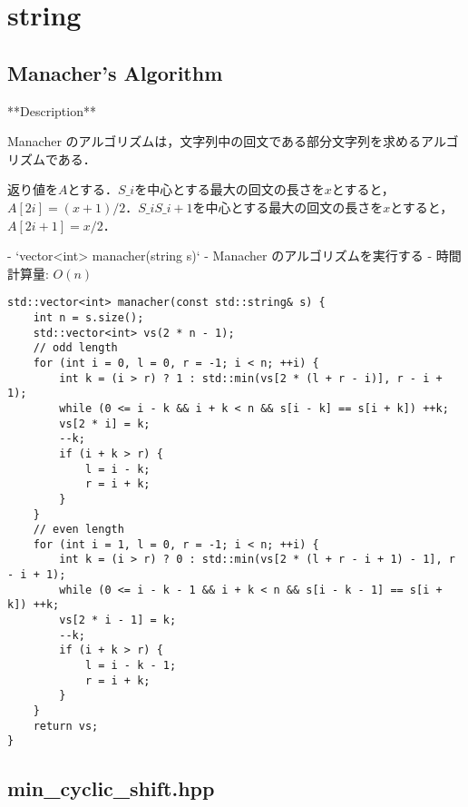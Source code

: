 \section{string}

\subsection{Manacher's Algorithm}

\begin{small}
\begin{markdown}
**Description**

Manacher のアルゴリズムは，文字列中の回文である部分文字列を求めるアルゴリズムである．

返り値を$A$とする．$S\_i$を中心とする最大の回文の長さを$x$とすると，$A[2i] = (x + 1) / 2$．$S\_iS\_{i+1}$を中心とする最大の回文の長さを$x$とすると，$A[2i + 1] = x / 2$．

- `vector<int> manacher(string s)`
    - Manacher のアルゴリズムを実行する
    - 時間計算量: $O(n)$

\end{markdown}
\end{small}

\begin{lstlisting}
std::vector<int> manacher(const std::string& s) {
    int n = s.size();
    std::vector<int> vs(2 * n - 1);
    // odd length
    for (int i = 0, l = 0, r = -1; i < n; ++i) {
        int k = (i > r) ? 1 : std::min(vs[2 * (l + r - i)], r - i + 1);
        while (0 <= i - k && i + k < n && s[i - k] == s[i + k]) ++k;
        vs[2 * i] = k;
        --k;
        if (i + k > r) {
            l = i - k;
            r = i + k;
        }
    }
    // even length
    for (int i = 1, l = 0, r = -1; i < n; ++i) {
        int k = (i > r) ? 0 : std::min(vs[2 * (l + r - i + 1) - 1], r - i + 1);
        while (0 <= i - k - 1 && i + k < n && s[i - k - 1] == s[i + k]) ++k;
        vs[2 * i - 1] = k;
        --k;
        if (i + k > r) {
            l = i - k - 1;
            r = i + k;
        }
    }
    return vs;
}
\end{lstlisting}

\subsection{min\_cyclic\_shift.hpp}

\begin{small}
\begin{markdown}

\end{markdown}
\end{small}

